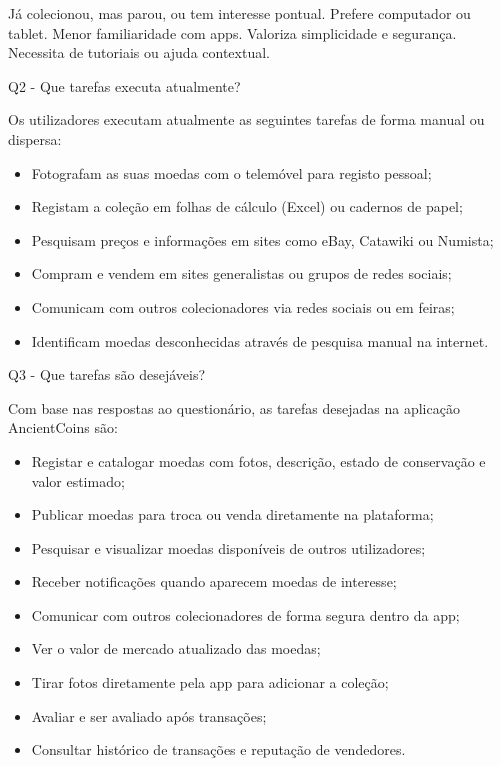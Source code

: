 \documentclass[12pt,a4paper]{article}
\begin{document}
Já colecionou, mas parou, ou tem interesse pontual. Prefere computador ou tablet. Menor familiaridade com apps. Valoriza simplicidade e segurança. Necessita de tutoriais ou ajuda contextual.

Q2 - Que tarefas executa atualmente?

Os utilizadores executam atualmente as seguintes tarefas de forma manual ou dispersa:

\begin{itemize}
\setlength{\itemsep}{0.15em}
\item Fotografam as suas moedas com o telemóvel para registo pessoal;
\item Registam a coleção em folhas de cálculo (Excel) ou cadernos de papel;
\item Pesquisam preços e informações em sites como eBay, Catawiki ou Numista;
\item Compram e vendem em sites generalistas ou grupos de redes sociais;
\item Comunicam com outros colecionadores via redes sociais ou em feiras;
\item Identificam moedas desconhecidas através de pesquisa manual na internet.
\end{itemize}

Q3 - Que tarefas são desejáveis?

Com base nas respostas ao questionário, as tarefas desejadas na aplicação AncientCoins são:

\begin{itemize}
\setlength{\itemsep}{0.15em}
\item Registar e catalogar moedas com fotos, descrição, estado de conservação e valor estimado;
\item Publicar moedas para troca ou venda diretamente na plataforma;
\item Pesquisar e visualizar moedas disponíveis de outros utilizadores;
\item Receber notificações quando aparecem moedas de interesse;
\item Comunicar com outros colecionadores de forma segura dentro da app;
\item Ver o valor de mercado atualizado das moedas;
\item Tirar fotos diretamente pela app para adicionar a coleção;
\item Avaliar e ser avaliado após transações;
\item Consultar histórico de transações e reputação de vendedores.
\end{itemize}
\end{document}
